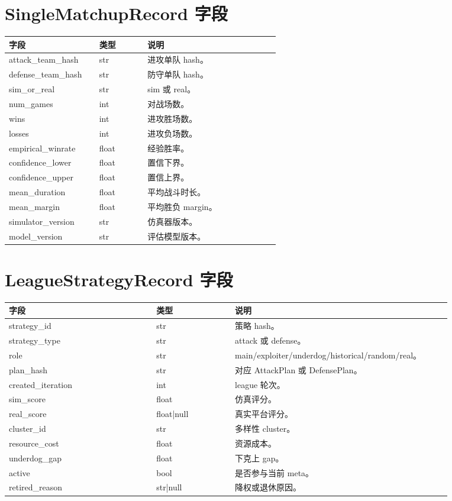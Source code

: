\documentclass[UTF8,12pt,openany]{ctexbook}
\begin{document}
\section{SingleMatchupRecord 字段}
\begin{longtable}{p{0.30\linewidth}p{0.16\linewidth}p{0.44\linewidth}}
\toprule
字段 & 类型 & 说明 \\
\midrule
attack\_team\_hash & str & 进攻单队 hash。\\
defense\_team\_hash & str & 防守单队 hash。\\
sim\_or\_real & str & sim 或 real。\\
num\_games & int & 对战场数。\\
wins & int & 进攻胜场数。\\
losses & int & 进攻负场数。\\
empirical\_winrate & float & 经验胜率。\\
confidence\_lower & float & 置信下界。\\
confidence\_upper & float & 置信上界。\\
mean\_duration & float & 平均战斗时长。\\
mean\_margin & float & 平均胜负 margin。\\
simulator\_version & str & 仿真器版本。\\
model\_version & str & 评估模型版本。\\
\bottomrule
\end{longtable}

\section{LeagueStrategyRecord 字段}
\begin{longtable}{p{0.30\linewidth}p{0.16\linewidth}p{0.44\linewidth}}
\toprule
字段 & 类型 & 说明 \\
\midrule
strategy\_id & str & 策略 hash。\\
strategy\_type & str & attack 或 defense。\\
role & str & main/exploiter/underdog/historical/random/real。\\
plan\_hash & str & 对应 AttackPlan 或 DefensePlan。\\
created\_iteration & int & league 轮次。\\
sim\_score & float & 仿真评分。\\
real\_score & float|null & 真实平台评分。\\
cluster\_id & str & 多样性 cluster。\\
resource\_cost & float & 资源成本。\\
underdog\_gap & float & 下克上 gap。\\
active & bool & 是否参与当前 meta。\\
retired\_reason & str|null & 降权或退休原因。\\
\bottomrule
\end{longtable}
\end{document}
